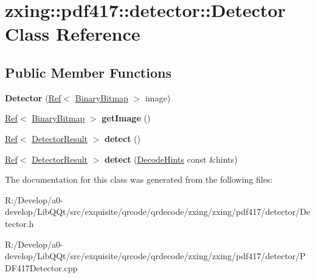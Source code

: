 \hypertarget{classzxing_1_1pdf417_1_1detector_1_1_detector}{}\section{zxing\+:\+:pdf417\+:\+:detector\+:\+:Detector Class Reference}
\label{classzxing_1_1pdf417_1_1detector_1_1_detector}
\subsection*{Public Member Functions}
\begin{DoxyCompactItemize}
\item 
\mbox{\label{classzxing_1_1pdf417_1_1detector_1_1_detector_af40360ab23a586cb57919874f0994518}} 
{\bfseries Detector} (\mbox{\hyperlink{classzxing_1_1_ref}{Ref}}$<$ \mbox{\hyperlink{classzxing_1_1_binary_bitmap}{Binary\+Bitmap}} $>$ image)
\item 
\mbox{\label{classzxing_1_1pdf417_1_1detector_1_1_detector_a9da0491e36462c96242ad05cbf925926}} 
\mbox{\hyperlink{classzxing_1_1_ref}{Ref}}$<$ \mbox{\hyperlink{classzxing_1_1_binary_bitmap}{Binary\+Bitmap}} $>$ {\bfseries get\+Image} ()
\item 
\mbox{\label{classzxing_1_1pdf417_1_1detector_1_1_detector_a6e9b6f9018641f11dbc6c55f026c0618}} 
\mbox{\hyperlink{classzxing_1_1_ref}{Ref}}$<$ \mbox{\hyperlink{classzxing_1_1_detector_result}{Detector\+Result}} $>$ {\bfseries detect} ()
\item 
\mbox{\label{classzxing_1_1pdf417_1_1detector_1_1_detector_a8a696e0c2047f3169a515564a0006930}} 
\mbox{\hyperlink{classzxing_1_1_ref}{Ref}}$<$ \mbox{\hyperlink{classzxing_1_1_detector_result}{Detector\+Result}} $>$ {\bfseries detect} (\mbox{\hyperlink{classzxing_1_1_decode_hints}{Decode\+Hints}} const \&hints)
\end{DoxyCompactItemize}


The documentation for this class was generated from the following files\+:\begin{DoxyCompactItemize}
\item 
R\+:/\+Develop/a0-\/develop/\+Lib\+Q\+Qt/src/exquisite/qrcode/qrdecode/zxing/zxing/pdf417/detector/Detector.\+h\item 
R\+:/\+Develop/a0-\/develop/\+Lib\+Q\+Qt/src/exquisite/qrcode/qrdecode/zxing/zxing/pdf417/detector/P\+D\+F417\+Detector.\+cpp\end{DoxyCompactItemize}
